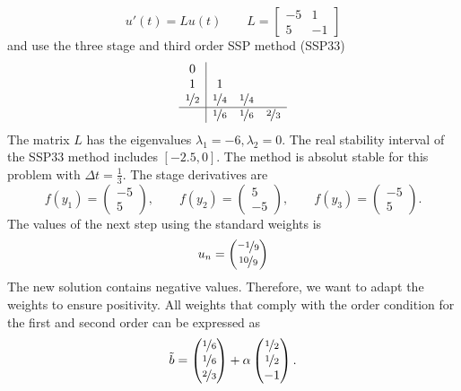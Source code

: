 \documentclass[a4paper]{article}
\numberwithin{equation}{section}
\theoremstyle{plain}
\theoremstyle{definition}
\numberwithin{theorem}{section}
\newcommand{\dt}{{\Delta t}}
\newcommand{\1}{\mathbbm{1}}
\newcommand{\bt}{\tilde{b}}
\begin{document}
\begin{equation}
u'(t) = L u(t) \qquad L = \left[\begin{matrix}- 5 & 1\\5 & -1\end{matrix}\right] 
\end{equation}
and use the three stage and third order SSP method (SSP33)
\begin{align}
\begin{array}{c|ccc}
0 &  &  & \\
1 & 1 &  & \\
\nicefrac{1}{2} & \nicefrac{1}{4} & \nicefrac{1}{4} & \\
\hline
 & \nicefrac{1}{6} & \nicefrac{1}{6} & \nicefrac{2}{3}\\
\end{array}
\end{align}
The matrix $L$ has the eigenvalues $\lambda_1 = -6,\lambda_2=0$. The real stability interval of the SSP33 method includes $[-2.5,0]$. The method is absolut stable for this problem with $\dt = \frac{1}{3}$.
The stage derivatives are
\begin{equation}
f(y_1)=\left(\begin{matrix}-5\\5\end{matrix}\right),\qquad f(y_2)=\left(\begin{matrix}5\\-5\end{matrix}\right),\qquad f(y_3)=\left(\begin{matrix}-5\\5\end{matrix}\right).
\end{equation}
The values of the next step using the standard weights is
\begin{equation}
u_n=\left(\begin{matrix} \nicefrac{-1}{9}\\ \nicefrac{10}{9}\end{matrix}\right)
\end{equation}
The new solution contains negative values. 
Therefore, we want to adapt the weights to ensure positivity. 
All weights that comply with the order condition for the first and second order can be expressed as
\begin{equation}
\bt=\begin{pmatrix}\nicefrac{1}{6}\\ \nicefrac{1}{6}\\ \nicefrac{2}{3}\end{pmatrix}+\alpha \begin{pmatrix}\nicefrac{1}{2}\\\nicefrac{1}{2}\\-1\end{pmatrix}.
\end{equation}
\end{document}
